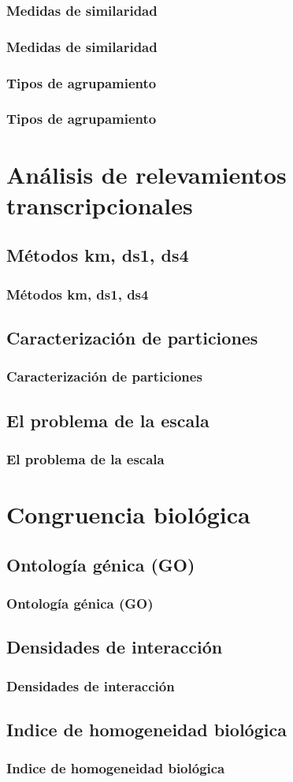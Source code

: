 \documentclass[serif,9pt]{beamer}
\begin{document}
\subsubsection*{Medidas de similaridad}
\begin{frame}
\frametitle{Medidas de similaridad} 
\end{frame}

\subsubsection*{Tipos de agrupamiento}
\begin{frame}
\frametitle{Tipos de agrupamiento} 
\end{frame}

\section{Análisis de relevamientos transcripcionales}

\subsection{Métodos km, ds1, ds4}
\begin{frame}
\frametitle{Métodos km, ds1, ds4} 
\end{frame}

\subsection{Caracterización de particiones}
\begin{frame}
\frametitle{Caracterización de particiones} 
\end{frame}

\subsection{El problema de la escala}
\begin{frame}
\frametitle{El problema de la escala} 
\end{frame}

\section{Congruencia biológica}

\subsection{Ontología génica (GO)}
\begin{frame}
\frametitle{Ontología génica (GO)} 
\end{frame}

\subsection{Densidades de interacción}
\begin{frame}
\frametitle{Densidades de interacción} 
\end{frame}

\subsection{Indice de homogeneidad biológica}
\begin{frame}
\frametitle{Indice de homogeneidad biológica} 
\end{frame}
\end{document}

